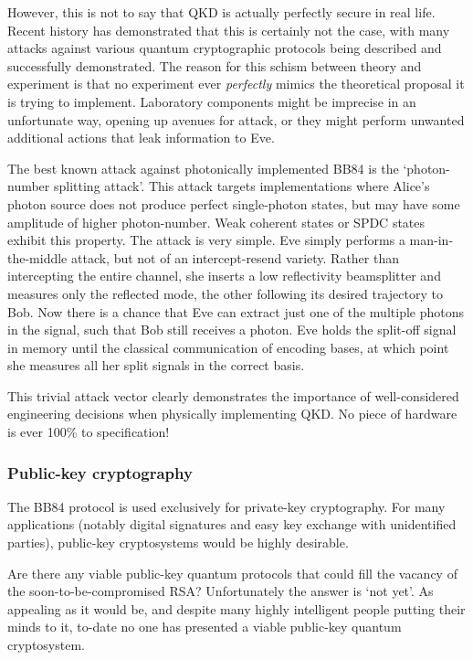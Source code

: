 However, this is not to say that QKD is actually perfectly secure in real life. Recent history has demonstrated that this is certainly not the case, with many attacks against various quantum cryptographic protocols being described and successfully demonstrated. The reason for this schism between theory and experiment is that no experiment ever \textit{perfectly} mimics the theoretical proposal it is trying to implement. Laboratory components might be imprecise in an unfortunate way, opening up avenues for attack, or they might perform unwanted additional actions that leak information to Eve.

The best known attack against photonically implemented BB84 is the `photon-number splitting attack'. This attack targets implementations where Alice's photon source does not produce perfect single-photon states, but may have some amplitude of higher photon-number. Weak coherent states or SPDC states exhibit this property. The attack is very simple. Eve simply performs a man-in-the-middle attack, but not of an intercept-resend variety. Rather than intercepting the entire channel, she inserts a low reflectivity beamsplitter and measures only the reflected mode, the other following its desired trajectory to Bob. Now there is a chance that Eve can extract just one of the multiple photons in the signal, such that Bob still receives a photon. Eve holds the split-off signal in memory until the classical communication of encoding bases, at which point she measures all her split signals in the correct basis.

This trivial attack vector clearly demonstrates the importance of well-considered engineering decisions when physically implementing QKD. No piece of hardware is ever 100\% to specification!


\subsubsection{Public-key cryptography}

The BB84 protocol is used exclusively for private-key cryptography. For many applications (notably digital signatures and easy key exchange with unidentified parties), public-key cryptosystems would be highly desirable.

Are there any viable public-key quantum protocols that could fill the vacancy of the soon-to-be-compromised RSA? Unfortunately the answer is `not yet'. As appealing as it would be, and despite many highly intelligent people putting their minds to it, to-date no one has presented a viable public-key quantum cryptosystem.

